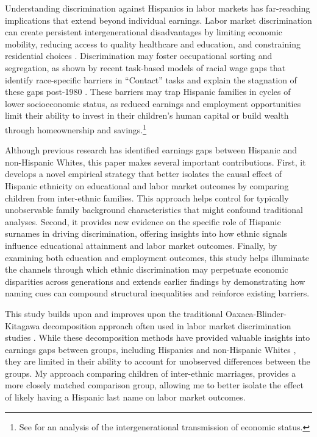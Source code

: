 Understanding discrimination against Hispanics in labor markets has far-reaching implications that extend beyond individual earnings. Labor market discrimination can create persistent intergenerational disadvantages by limiting economic mobility, reducing access to quality healthcare and education, and constraining residential choices \autocite{chettyUnitedStatesStill2014, chettyEffectsExposureBetter2016,chettyFadingAmericanDream2017,bowles2002inheritance, djajic2003assimilation}. Discrimination may foster occupational sorting and segregation, as shown by recent task-based models of racial wage gaps that identify race-specific barriers in “Contact” tasks and explain the stagnation of these gaps post-1980 \autocite{hurst2024task}. These barriers may trap Hispanic families in cycles of lower socioeconomic status, as reduced earnings and employment opportunities limit their ability to invest in their children's human capital or build wealth through homeownership and savings.\footnote{See \textcite{bowles2002inheritance} for an analysis of the intergenerational transmission of economic status.} 

Although previous research has identified earnings gaps between Hispanic and non-Hispanic Whites, this paper makes several important contributions. First, it develops a novel empirical strategy that better isolates the causal effect of Hispanic ethnicity on educational and labor market outcomes by comparing children from inter-ethnic families. This approach helps control for typically unobservable family background characteristics that might confound traditional analyses. Second, it provides new evidence on the specific role of Hispanic surnames in driving discrimination, offering insights into how ethnic signals influence educational attainment and labor market outcomes. Finally, by examining both education and employment outcomes, this study helps illuminate the channels through which ethnic discrimination may perpetuate economic disparities across generations and extends earlier findings by demonstrating how naming cues can compound structural inequalities and reinforce existing barriers.

This study builds upon and improves upon the traditional Oaxaca-Blinder-Kitagawa decomposition approach often used in labor market discrimination studies \autocite{kitagawa1955components, oaxaca1973male,blinder1973wage}. While these decomposition methods have provided valuable insights into earnings gaps between groups, including Hispanics and non-Hispanic Whites \autocite{davilaChangesRelativeEarnings2008}, they are limited in their ability to account for unobserved differences between the groups. My approach comparing children of inter-ethnic marriages, provides a more closely matched comparison group, allowing me to better isolate the effect of likely having a Hispanic last name on labor market outcomes.

